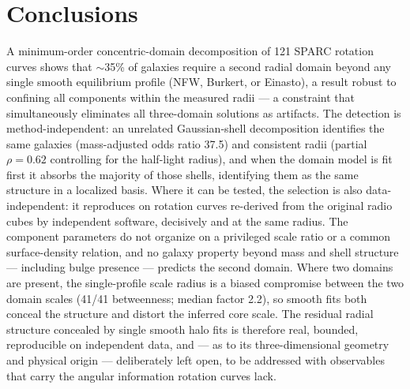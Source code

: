\documentclass[twocolumn]{aastex631}
\begin{document}
\section{Conclusions} \label{sec:conclusions}

A minimum-order concentric-domain decomposition of 121 SPARC rotation curves
shows that $\sim$35\% of galaxies require a second radial domain beyond any
single smooth equilibrium profile (NFW, Burkert, or Einasto), a result robust
to confining all components within the measured radii --- a constraint that
simultaneously eliminates all three-domain solutions as artifacts. The
detection is method-independent: an unrelated Gaussian-shell decomposition
identifies the same galaxies (mass-adjusted odds ratio 37.5) and consistent
radii (partial $\rho = 0.62$ controlling for the half-light radius), and when
the domain model is fit first it absorbs the majority of those shells,
identifying them as the same structure in a localized basis. Where it can be
tested, the selection is also data-independent: it reproduces on rotation curves
re-derived from the original radio cubes by independent software, decisively and
at the same radius. The
component parameters do not organize on a privileged scale ratio or a common
surface-density relation, and no galaxy property beyond mass and shell
structure --- including bulge presence --- predicts the second domain. Where
two domains are present, the single-profile scale radius is a biased
compromise between the two domain scales (41/41 betweenness; median factor
2.2), so smooth fits both conceal the structure and distort the inferred
core scale. The residual radial structure concealed
by single smooth halo fits is therefore real, bounded, reproducible on
independent data, and --- as to its three-dimensional geometry and physical
origin --- deliberately left open, to be addressed with observables that carry
the angular information rotation curves lack.

\begin{acknowledgments}
\end{acknowledgments}


\end{document}

